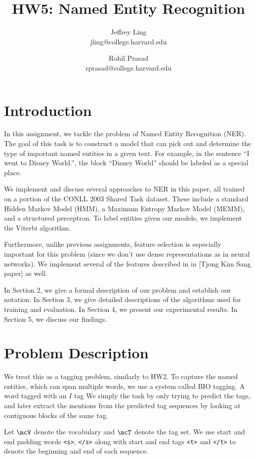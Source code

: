\documentclass[11pt]{article}
\title{HW5: Named Entity Recognition}
\author{Jeffrey Ling \\ jling@college.harvard.edu \and Rohil Prasad \\ rprasad@college.harvard.edu}
\begin{document}
\maketitle{}
\section{Introduction}

In this assignment, we tackle the problem of Named Entity Recognition (NER). The goal of this task is to construct a model that can pick out and determine the type of important named entities in a given text. For example, in the sentence ``I went to Disney World.'', the block ``Disney World'' should be labeled as a special place. 

We implement and discuss several approaches to NER in this paper, all trained on a portion of the CONLL 2003 Shared Task dataset. These include a standard Hidden Markov Model (HMM), a Maximum Entropy Markov Model (MEMM), and a structured perceptron. To label entities given our models, we implement the Viterbi algorithm.

Furthermore, unlike previous assignments, feature selection is especially important for this problem (since we don't use dense representations as in neural networks). We implement several of the features described in in [Tjong Kim Sang paper] as well. 

In Section 2, we give a formal description of our problem and establish our notation. In Section 3, we give detailed descriptions of the algorithms used for training and evaluation. In Section 4, we present our experimental results. In Section 5, we discuss our findings. 

\section{Problem Description}

We treat this as a tagging problem, similarly to HW2. To capture the named entities, which can span multiple words, we use a system called BIO tagging. A word tagged with an $I$ tag %
We simply the task by only trying to predict the tags, and later extract the mentions from the predicted tag sequences by looking at contiguous blocks of the same tag.


Let $\mcV$ denote the vocabulary and $\mcT$ denote the tag set. We use start and end padding words \texttt{<s>}, \texttt{</s>} along with start and end tags \texttt{<t>} and \texttt{</t>} to denote the beginning and end of each sequence.
\end{document}
